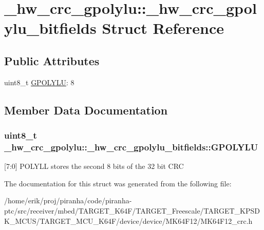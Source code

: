 \hypertarget{struct__hw__crc__gpolylu_1_1__hw__crc__gpolylu__bitfields}{}\section{\+\_\+hw\+\_\+crc\+\_\+gpolylu\+:\+:\+\_\+hw\+\_\+crc\+\_\+gpolylu\+\_\+bitfields Struct Reference}
\label{struct__hw__crc__gpolylu_1_1__hw__crc__gpolylu__bitfields}
\subsection*{Public Attributes}
\begin{DoxyCompactItemize}
\item 
uint8\+\_\+t \hyperlink{struct__hw__crc__gpolylu_1_1__hw__crc__gpolylu__bitfields_a1385aab66900e86f72e84b2ddf5aac2f}{G\+P\+O\+L\+Y\+LU}\+: 8
\end{DoxyCompactItemize}


\subsection{Member Data Documentation}
\subsubsection[{\texorpdfstring{G\+P\+O\+L\+Y\+LU}{GPOLYLU}}]{\setlength{\rightskip}{0pt plus 5cm}uint8\+\_\+t \+\_\+hw\+\_\+crc\+\_\+gpolylu\+::\+\_\+hw\+\_\+crc\+\_\+gpolylu\+\_\+bitfields\+::\+G\+P\+O\+L\+Y\+LU}\hypertarget{struct__hw__crc__gpolylu_1_1__hw__crc__gpolylu__bitfields_a1385aab66900e86f72e84b2ddf5aac2f}{}\label{struct__hw__crc__gpolylu_1_1__hw__crc__gpolylu__bitfields_a1385aab66900e86f72e84b2ddf5aac2f}
\mbox{[}7\+:0\mbox{]} P\+O\+L\+Y\+LL stores the second 8 bits of the 32 bit C\+RC 

The documentation for this struct was generated from the following file\+:\begin{DoxyCompactItemize}
\item 
/home/erik/proj/piranha/code/piranha-\/ptc/src/receiver/mbed/\+T\+A\+R\+G\+E\+T\+\_\+\+K64\+F/\+T\+A\+R\+G\+E\+T\+\_\+\+Freescale/\+T\+A\+R\+G\+E\+T\+\_\+\+K\+P\+S\+D\+K\+\_\+\+M\+C\+U\+S/\+T\+A\+R\+G\+E\+T\+\_\+\+M\+C\+U\+\_\+\+K64\+F/device/device/\+M\+K64\+F12/M\+K64\+F12\+\_\+crc.\+h\end{DoxyCompactItemize}
